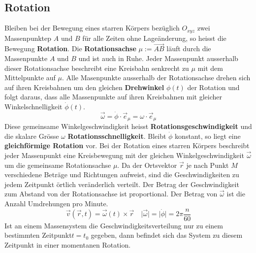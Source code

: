 \subsection{Rotation}
Bleiben bei der Bewegung eines starren Körpers bezüglich $O_{xyz}$ zwei Massenpunktep $A$ und $B$ für alle Zeiten ohne Lageänderung, so heisst die Bewegung \textbf{Rotation}.
\newline\newline
Die \textbf{Rotationsachse} $\mu:=\overrightarrow{AB}$ läuft durch die Massenpunkte $A$ und $B$ und ist auch in Ruhe. Jeder Massenpunkt ausserhalb dieser Rotationsachse beschreibt eine Kreisbahn senkrecht zu $\mu$ mit dem Mittelpunkte auf $\mu$. Alle Masenpunkte ausserhalb der Rotationsachse drehen sich auf ihren Kreisbahnen um den gleichen \textbf{Drehwinkel} $\phi\left(t\right)$ der Rotation und folgt daraus, dass alle Massenpunkte auf ihren Kreisbahnen mit gleicher Winkelschnelligkeit $\dot{\phi}\left(t\right)$.
\begin{equation}
\boxed{\overrightarrow{\omega}=\dot{\phi}\cdot \overrightarrow{e}_{\mu}=\omega\cdot \overrightarrow{e}_{\mu}}
\end{equation}
Diese gemeinsame Winkelgeschwindigkeit heisst \textbf{Rotationsgeschwindigkeit} und die skalare Grösse $\omega$ \textbf{Rotationsschnelligkeit}. Bleibt $\dot{\phi}$ konstant, so liegt eine \textbf{gleichförmige Rotation} vor.
\newline\newline
Bei der Rotation eines starren Körpers beschreibt jeder Massenpunkt eine Kreisbewegung mit der gleichen Winkelgeschwindigkeit $\overrightarrow{\omega}$ um die gemeinsame Rotationsachse $\mu$.
\newline\newline
Da der Ortsvektor $\overrightarrow{r}$ je nach Punkt $M$ verschiedene Beträge und Richtungen aufweist, sind die Geschwindigkeiten zu jedem Zeitpunkt örtlich veränderlich verteilt. Der Betrag der Geschwindigkeit zum Abstand von der Rotationsachse ist proportional. Der Betrag von $\overrightarrow{\omega}$ ist die Anzahl Umdrehungen pro Minute.
\begin{equation}
\boxed{\overrightarrow{v}\left(\overrightarrow{r}, t\right)=\overrightarrow{\omega}(t)\times \overrightarrow{r}}\quad \boxed{\Big\vert\overrightarrow{\omega}\Big\vert=\Big\vert\dot{\phi}\Big\vert=2\pi\dfrac{n}{60}} 
\end{equation}
Ist an einem Massensystem die Geschwindigkeitsverteilung nur zu einem bestimmten Zeitpunkt$t=t_0$ gegeben, dann befindet sich das System zu diesem Zeitpunkt in einer momentanen Rotation.
\newline\newline
